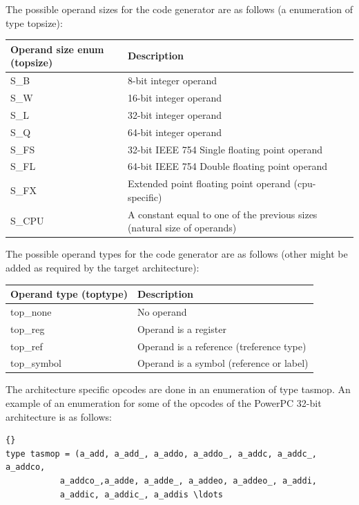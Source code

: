 \documentclass [a4paper,12pt]{article}
\begin{document}
The possible operand sizes for the code generator are as follows (a
enumeration of type \textsf{topsize}):

\begin{longtable}{|l|p{10cm}|}
\hline
Operand size enum (\textsf{topsize}) & Description \\
\hline
\endhead
\hline
\endfoot
\textsf{S{\_}B}& 			8-bit integer operand \\
\textsf{S{\_}W}& 			16-bit integer operand \\
\textsf{S{\_}L}& 			32-bit integer operand \\
\textsf{S{\_}Q}& 			64-bit integer operand \\
\textsf{S{\_}FS}& 			32-bit IEEE 754 Single floating point operand \\
\textsf{S{\_}FL}& 			64-bit IEEE 754 Double floating point operand \\
\textsf{S{\_}FX}& 			Extended point floating point operand (cpu-specific) \\
\textsf{S{\_}CPU}&			A constant equal to one of the previous sizes (natural size of operands) \\
\end{longtable}

The possible operand types for the code generator are as follows (other
might be added as required by the target architecture):

\begin{longtable}{|l|p{10cm}|}
\hline
Operand type (\textsf{toptype}) & Description \\
\hline
\endhead
\hline
\endfoot
\textsf{top{\_}none}& 			No operand \\
\textsf{top{\_}reg}& 			Operand is a register \\
\textsf{top{\_}ref}& 			Operand is a reference (\textsf{treference} type) \\
\textsf{top{\_}symbol}& 		Operand is a symbol (reference or label) \\
\end{longtable}

The architecture specific opcodes are done in an enumeration of type
\textsf{tasmop}. An example of an enumeration for some of the opcodes of the
PowerPC 32-bit architecture is as follows:

\begin{lstlisting}{}
type tasmop = (a_add, a_add_, a_addo, a_addo_, a_addc, a_addc_, a_addco,
	       a_addco_,a_adde, a_adde_, a_addeo, a_addeo_, a_addi,
	       a_addic, a_addic_, a_addis \ldots
\end{lstlisting}
\end{document}
